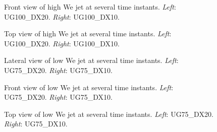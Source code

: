 \clearpage

\begin{figure}[ht]
\centering
{}
\caption[Front view of high We jet at several time instants. ]{Front view of high We jet at several time instants. \textsl{Left}: UG100\_DX20. \textsl{Right}: UG100\_DX10.}
\label{fig:JICF_establishment_UG100_front}
\end{figure}
\clearpage

\clearpage

\begin{figure}[ht]
\centering
{}
\caption[Top view of high We jet at several time instants. ]{Top view of high We jet at several time instants. \textsl{Left}: UG100\_DX20. \textsl{Right}: UG100\_DX10.}
\label{fig:JICF_establishment_UG100_top}
\end{figure}




\clearpage

\begin{figure}[ht]
\centering
{}
\caption[Lateral view of low We jet at several time instants. ]{Lateral view of low We jet at several time instants. \textsl{Left}: UG75\_DX20. \textsl{Right}: UG75\_DX10.}
\label{fig:JICF_establishment_UG75_lateral}
\end{figure}

\clearpage

\begin{figure}[ht]
\centering
{}
\caption[Front view of low We jet at several time instants. ]{Front view of low We jet at several time instants. \textsl{Left}: UG75\_DX20. \textsl{Right}: UG75\_DX10.}
\label{fig:JICF_establishment_UG75_front}
\end{figure}

\clearpage

\begin{figure}[ht]
\centering
{}
\caption[Top view of low We jet at several time instants. ]{Top view of low We jet at several time instants. \textsl{Left}: UG75\_DX20. \textsl{Right}: UG75\_DX10.}
\label{fig:JICF_establishment_UG75_top}
\end{figure}

